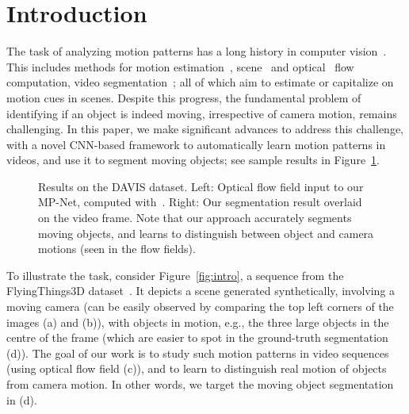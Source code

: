 \documentclass[10pt,twocolumn,letterpaper]{article}
\begin{document}
\vspace{-0.45cm}
\section{Introduction}
\vspace{-0.2cm}
The task of analyzing motion patterns has a long history in computer
vision~\cite{Torr98,Bideau16,Dosovitskiy15,Horn81,Vedula05,papazoglou2013fast,XuC16}.
This includes methods for motion estimation~\cite{Torr98,Bideau16},
scene~\cite{Vedula05} and optical~\cite{Dosovitskiy15,Horn81} flow computation,
video segmentation~\cite{papazoglou2013fast,XuC16}; all of which aim to
estimate or capitalize on motion cues in scenes. Despite this progress, the
fundamental problem of identifying if an object is indeed moving, irrespective
of camera motion, remains challenging. In this paper, we make significant
advances to address this challenge, with a novel CNN-based framework to
automatically learn motion patterns in videos, and use it to segment moving
objects; see sample results in Figure~\ref{fig:result}.

\begin{figure}[t]
\begin{center}
\vspace{0.1cm}
\end{center}
\vspace{-0.8cm}\caption{Results on the DAVIS dataset. Left: Optical flow field
input to our MP-Net, computed with~\cite{Brox11a}. Right: Our segmentation
result overlaid on the video frame. Note that our approach accurately segments
moving objects, and learns to distinguish between object and camera motions
(seen in the flow fields).\vspace{-0.6cm}}
\label{fig:result}
\end{figure}

To illustrate the task, consider Figure~\ref{fig:intro}, a sequence from the
FlyingThings3D dataset~\cite{Mayer16}. It depicts a scene generated
synthetically, involving a moving camera (can be easily observed by comparing
the top left corners of the images (a) and (b)), with objects in motion, e.g.,
the three large objects in the centre of the frame (which are easier to spot in
the ground-truth segmentation (d)). The goal of our work is to study such
motion patterns in video sequences (using optical flow field (c)), and to learn
to distinguish real motion of objects from camera motion. In other words, we
target the moving object segmentation in (d).
\end{document}
